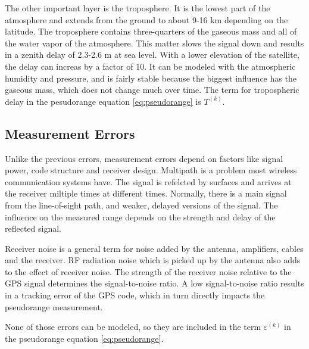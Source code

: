 The other important layer is the troposphere.
It is the lowest part of the atmosphere and extends from the ground to about 9-16 km depending on the latitude.
The troposphere contains three-quarters of the gaseous mass and all of the water vapor of the atmosphere.
This matter slows the signal down and results in a zenith delay of 2.3-2.6 m at sea level.
With a lower elevation of the satellite, the delay can increas by a factor of 10.
It can be modeled with the atmospheric humidity and pressure, and is fairly stable because the biggest influence has the gaseous mass, which does not change much over time.
The term for tropospheric delay in the pesudorange equation \ref{eq:pseudorange} is $T^{(k)}$.

\subsection{Measurement Errors}

Unlike the previous errors, measurement errors depend on factors like signal power, code structure and receiver design.
Multipath is a problem most wireless communication systems have.
The signal is refelcted by surfaces and arrives at the receiver miltiple times at different times.
Normally, there is a main signal from the line-of-sight path, and weaker, delayed versions of the signal.
The influence on the measured range depends on the strength and delay of the reflected signal.

Receiver noise is a general term for noise added by the antenna, amplifiers, cables and the receiver.
RF radiation noise which is picked up by the antenna also adds to the effect of receiver noise.
The strength of the receiver noise relative to the GPS signal determines the signal-to-noise ratio.
A low signal-to-noise ratio results in a tracking error of the GPS code, which in turn directly impacts the pseudorange measurement.

None of those errors can be modeled, so they are included in the term $\varepsilon^{(k)}$ in the pseudorange equation \ref{eq:pseudorange}. \cite{misra2011global}

